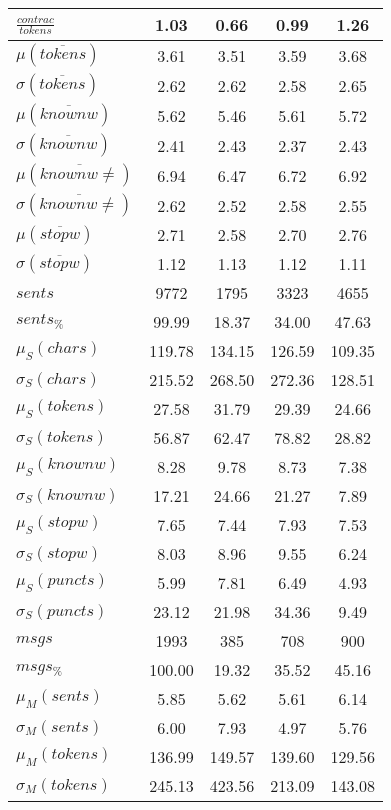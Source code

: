 \begin{table}[h!]
\begin{center}
\begin{tabular}{| l || c | c | c | c |}
$\frac{contrac}{tokens}$ & 1.03  & 0.66  & 0.99  & 1.26 \\\hline\hline
$\mu(\overline{tokens})$ & 3.61  & 3.51  & 3.59  & 3.68 \\
$\sigma(\overline{tokens})$ & 2.62  & 2.62  & 2.58  & 2.65 \\\hline
$\mu(\overline{knownw})$ & 5.62  & 5.46  & 5.61  & 5.72 \\
$\sigma(\overline{knownw})$ & 2.41  & 2.43  & 2.37  & 2.43 \\\hline
$\mu(\overline{knownw \neq})$ & 6.94  & 6.47  & 6.72  & 6.92 \\
$\sigma(\overline{knownw \neq})$ & 2.62  & 2.52  & 2.58  & 2.55 \\\hline
$\mu(\overline{stopw})$ & 2.71  & 2.58  & 2.70  & 2.76 \\
$\sigma(\overline{stopw})$ & 1.12  & 1.13  & 1.12  & 1.11 \\\hline\hline
$sents$ & 9772  & 1795  & 3323  & 4655 \\
$sents_{\%}$ & 99.99  & 18.37  & 34.00  & 47.63 \\\hline
$\mu_S(chars)$ & 119.78  & 134.15  & 126.59  & 109.35 \\
$\sigma_S(chars)$ & 215.52  & 268.50  & 272.36  & 128.51 \\\hline
$\mu_S(tokens)$ & 27.58  & 31.79  & 29.39  & 24.66 \\
$\sigma_S(tokens)$ & 56.87  & 62.47  & 78.82  & 28.82 \\\hline
$\mu_S(knownw)$ & 8.28  & 9.78  & 8.73  & 7.38 \\
$\sigma_S(knownw)$ & 17.21  & 24.66  & 21.27  & 7.89 \\\hline
$\mu_S(stopw)$ & 7.65  & 7.44  & 7.93  & 7.53 \\
$\sigma_S(stopw)$ & 8.03  & 8.96  & 9.55  & 6.24 \\\hline
$\mu_S(puncts)$ & 5.99  & 7.81  & 6.49  & 4.93 \\
$\sigma_S(puncts)$ & 23.12  & 21.98  & 34.36  & 9.49 \\\hline\hline
$msgs$ & 1993  & 385  & 708  & 900 \\
$msgs_{\%}$ & 100.00  & 19.32  & 35.52  & 45.16 \\\hline
$\mu_M(sents)$ & 5.85  & 5.62  & 5.61  & 6.14 \\
$\sigma_M(sents)$ & 6.00  & 7.93  & 4.97  & 5.76 \\\hline
$\mu_M(tokens)$ & 136.99  & 149.57  & 139.60  & 129.56 \\
$\sigma_M(tokens)$ & 245.13  & 423.56  & 213.09  & 143.08 \\\hline

\end{tabular}
\end{center}
\end{table}
